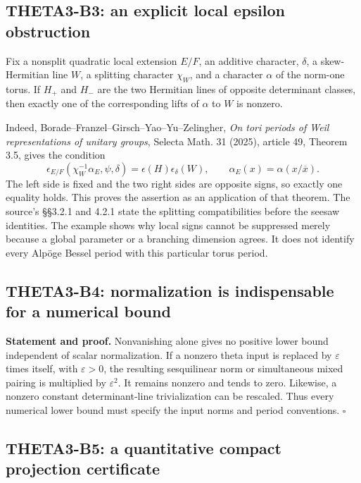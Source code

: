 \documentclass[11pt]{article}
\theoremstyle{definition}\newtheorem{definition}[theorem]{Definition}\newtheorem{remark}[theorem]{Remark}
\begin{document}
\subsection{THETA3-B3: an explicit local epsilon obstruction}\label{B3}

Fix a nonsplit quadratic local extension $E/F$, an additive character, $\delta$, a skew-Hermitian line $W$, a splitting character $\chi_W$, and a character $\alpha$ of the norm-one torus. If $H_+$ and $H_-$ are the two Hermitian lines of opposite determinant classes, then exactly one of the corresponding lifts of $\alpha$ to $W$ is nonzero.

Indeed, Borade--Franzel--Girsch--Yao--Yu--Zelingher, \emph{On tori periods of Weil representations of unitary groups}, Selecta Math. 31 (2025), article 49, Theorem 3.5, gives the condition
\[
 \epsilon_{E/F}(\chi_W^{-1}\alpha_E,\psi,\delta)
       =\epsilon(H)\epsilon_\delta(W),
 \qquad \alpha_E(x)=\alpha(x/\overline x).
\]
The left side is fixed and the two right sides are opposite signs, so exactly one equality holds. This proves the assertion as an application of that theorem. The source's \S\S3.2.1 and 4.2.1 state the splitting compatibilities before the seesaw identities. The example shows why local signs cannot be suppressed merely because a global parameter or a branching dimension agrees. It does not identify every Alp\"oge Bessel period with this particular torus period.

\subsection{THETA3-B4: normalization is indispensable for a numerical bound}\label{B4}

\textbf{Statement and proof.} Nonvanishing alone gives no positive lower bound independent of scalar normalization. If a nonzero theta input is replaced by $\varepsilon$ times itself, with $\varepsilon>0$, the resulting sesquilinear norm or simultaneous mixed pairing is multiplied by $\varepsilon^2$. It remains nonzero and tends to zero. Likewise, a nonzero constant determinant-line trivialization can be rescaled. Thus every numerical lower bound must specify the input norms and period conventions. \hfill$\square$

\subsection{THETA3-B5: a quantitative compact projection certificate}\label{B5}
\end{document}
